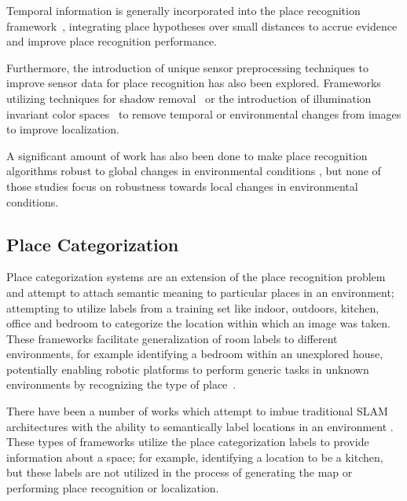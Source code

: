 \documentclass[letterpaper, 10 pt, conference]{ieeeconf}  %
\begin{document}
Temporal information is generally incorporated into the place recognition framework~\cite{Milford2012}, integrating place hypotheses over small distances to accrue evidence and improve place recognition performance.

Furthermore, the introduction of unique sensor preprocessing techniques to improve sensor data for place recognition has also been explored. Frameworks utilizing techniques for shadow removal~\cite{corke2013dealing} or the introduction of illumination invariant color spaces~\cite{mcmanus2014shady} to remove temporal or environmental changes from images to improve localization. 

A significant amount of work has also been done to make place recognition algorithms robust to global changes in environmental conditions \cite{Maddern,McManus2015}, but none of those studies focus on robustness towards local changes in environmental conditions.


\subsection{Place Categorization}

Place categorization systems are an extension of the place recognition problem and attempt to attach semantic meaning to particular places in an environment; attempting to utilize labels from a training set like indoor, outdoors, kitchen, office and bedroom to categorize the location within which an image was taken. These frameworks facilitate generalization of room labels to different environments, for example identifying a bedroom within an unexplored house, potentially enabling robotic platforms to perform generic tasks in unknown environments by recognizing the type of place~\cite{wu2009visual}. 

There have been a number of works which attempt to imbue traditional SLAM architectures with the ability to semantically label locations in an environment \cite{sunderhauf2016place}. These types of frameworks utilize the place categorization labels to provide information about a space; for example, identifying a location to be a kitchen, but these labels are not utilized in the process of generating the map or performing place recognition or localization. 
\end{document}
